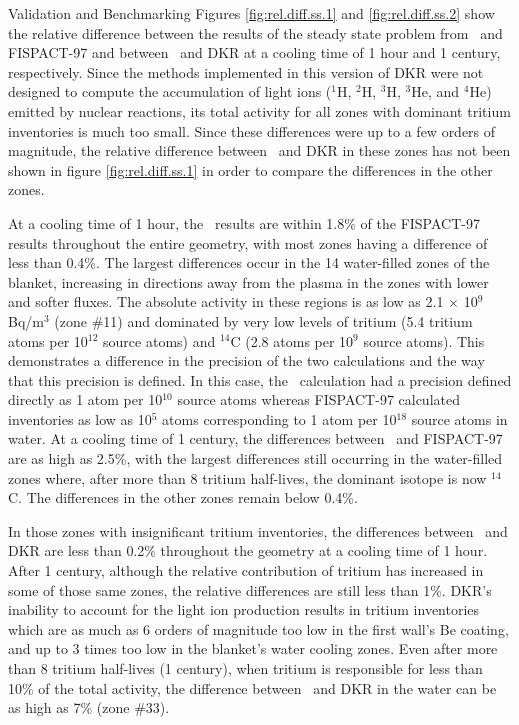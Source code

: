 \begin{chapter}{Validation and Benchmarking}
Figures \ref{fig:rel.diff.ss.1} and \ref{fig:rel.diff.ss.2} show the
relative difference between the results of the steady state problem
from \ALARA\ and FISPACT-97 and between \ALARA\ and DKR at a cooling time
of 1 hour and 1 century, respectively.  Since the methods implemented
in this version of DKR were not designed to compute the accumulation of
light ions ($^1$H, $^2$H, $^3$H, $^3$He, and $^4$He) emitted by
nuclear reactions, its total activity for all zones with dominant
tritium inventories is much too small.  Since these differences were
up to a few orders of magnitude, the relative difference between \ALARA\
and DKR in these zones has not been shown in figure
\ref{fig:rel.diff.ss.1} in order to compare the differences in the
other zones.

At a cooling time of 1 hour, the \ALARA\ results are within 1.8\% of the
FISPACT-97 results throughout the entire geometry, with most zones
having a difference of less than 0.4\%.  The largest differences occur
in the 14 water-filled zones of the blanket, increasing in directions
away from the plasma in the zones with lower and softer fluxes.  The
absolute activity in these regions is as low as 2.1 $\times$ 10$^9$
Bq/m$^3$ (zone \#11) and dominated by very low levels of tritium (5.4
tritium atoms per 10$^{12}$ source atoms) and $^{14}$C (2.8 atoms per
10$^9$ source atoms).  This demonstrates a difference in the precision
of the two calculations and the way that this precision is defined.
In this case, the \ALARA\ calculation had a precision defined directly
as 1 atom per 10$^{10}$ source atoms whereas FISPACT-97 calculated
inventories as low as 10$^{5}$ atoms corresponding to 1 atom per
10$^{18}$ source atoms in water.  At a cooling time of 1 century, the
differences between \ALARA\ and FISPACT-97 are as high as 2.5\%, with
the largest differences still occurring in the water-filled zones
where, after more than 8 tritium half-lives, the dominant isotope is
now $^{14}$C.  The differences in the other zones remain below 0.4\%.

In those zones with insignificant tritium inventories, the differences
between \ALARA\ and DKR are less than 0.2\% throughout the geometry at a
cooling time of 1 hour.  After 1 century, although the relative
contribution of tritium has increased in some of those same zones, the
relative differences are still less than 1\%.  DKR's inability to
account for the light ion production results in tritium inventories
which are as much as 6 orders of magnitude too low in the first wall's
Be coating, and up to 3 times too low in the blanket's water cooling
zones.  Even after more than 8 tritium half-lives (1
century), when tritium is responsible for less than 10\% of the total
activity, the difference between \ALARA\ and DKR in the water can be as
high as 7\% (zone \#33).


\end{chapter}
